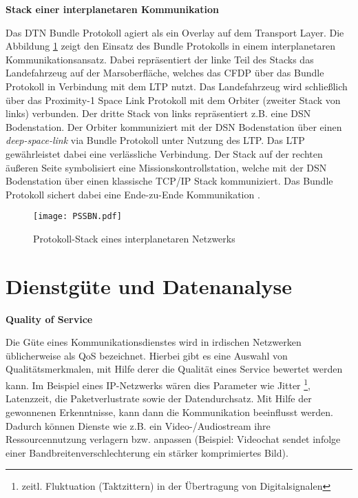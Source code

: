 \textbf{Stack einer interplanetaren Kommunikation}

Das \gls{DTN} Bundle Protokoll agiert als ein Overlay auf dem Transport Layer. Die
Abbildung \ref{fig:PSSBN} zeigt den Einsatz des Bundle Protokolls in einem
interplanetaren Kommunikationsansatz.
Dabei repr{\"a}sentiert der linke Teil des Stacks das Landefahrzeug auf der
Marsoberfl{\"a}che, welches das \gls{CFDP} {\"u}ber das Bundle Protokoll in
Verbindung mit dem \gls{LTP} nutzt.
Das Landefahrzeug wird schlie{\ss}lich {\"u}ber das Proximity-1 Space Link
Protokoll mit dem Orbiter (zweiter Stack von links) verbunden. Der dritte Stack
von links repr{\"a}sentiert z.B. eine \gls{DSN} Bodenstation. Der
Orbiter kommuniziert mit der \gls{DSN} Bodenstation {\"u}ber einen
\textit{deep-space-link} via Bundle Protokoll unter Nutzung des \gls{LTP}. Das
\gls{LTP} gew{\"a}hrleistet dabei eine verl{\"a}ssliche Verbindung. Der Stack
auf der rechten {\"a}u{\ss}eren Seite symbolisiert eine Missionskontrollstation,
welche mit der \gls{DSN} Bodenstation {\"u}ber einen klassische
\gls{TCP}/\gls{IP} Stack kommuniziert. Das Bundle Protokoll sichert dabei eine
Ende-zu-Ende Kommunikation \cite{DTNBundle}.

\begin{figure}[H]
	\centering
	\texttt{[image: PSSBN.pdf]}
	\caption[Protokoll-Stack eines interplanetaren Netzwerks]
	{Protokoll-Stack eines interplanetaren Netzwerks \cite{DTNBundle}}
	\label{fig:PSSBN}
\end{figure}

\section{Dienstg{\"u}te und Datenanalyse}

\textbf{Quality of Service}

Die G{\"u}te eines Kommunikationsdienstes wird in irdischen Netzwerken
{\"u}blicherweise als \gls{QoS} bezeichnet. Hierbei gibt es eine
Auswahl von Qualit{\"a}tsmerkmalen, mit Hilfe derer die Qualit{\"a}t eines
Service bewertet werden kann. Im Beispiel eines IP-Netzwerks w{\"a}ren dies
Parameter wie Jitter \footnote{zeitl. Fluktuation (Taktzittern) in der
{\"U}bertragung von Digitalsignalen}, Latenzzeit, die Paketverlustrate sowie der
Datendurchsatz. Mit Hilfe der gewonnenen Erkenntnisse, kann dann die
Kommunikation beeinflusst werden. Dadurch k{\"o}nnen Dienste wie z.B. ein
Video-/Audiostream ihre Ressourcennutzung verlagern bzw. anpassen
(Beispiel: Videochat sendet infolge einer Bandbreitenverschlechterung ein
st{\"a}rker komprimiertes Bild). 


